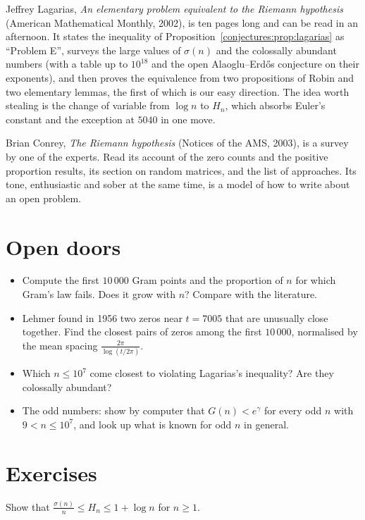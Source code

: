 Jeffrey Lagarias, \emph{An elementary problem equivalent to the Riemann hypothesis} (American Mathematical Monthly, 2002), is ten pages long and can be
read in an afternoon. It states the inequality of Proposition~\ref{conjectures:prop:lagarias} as ``Problem E'', surveys the large values of $\sigma(n)$ and the colossally
abundant numbers (with a table up to $10^{18}$ and the open Alaoglu--Erd\H{o}s conjecture on their exponents), and then proves the equivalence from two
propositions of Robin and two elementary lemmas, the first of which is our easy direction. The idea worth stealing is the change of variable from
$\log n$ to $H_n$, which absorbs Euler's constant and the exception at $5040$ in one move.

Brian Conrey, \emph{The Riemann hypothesis} (Notices of the AMS, 2003), is a survey by one of the experts. Read its account of the zero counts and the
positive proportion results, its section on random matrices, and the list of approaches. Its tone, enthusiastic and sober at the same time, is a model
of how to write about an open problem.

\section{Open doors}

\begin{itemize}
\item Compute the first $10\,000$ Gram points and the proportion of $n$ for which Gram's law fails. Does it grow with $n$? Compare with the literature.
\item Lehmer found in 1956 two zeros near $t=7005$ that are unusually close together. Find the closest pairs of zeros among the first $10\,000$, normalised
by the mean spacing $\frac{2\pi}{\log(t/2\pi)}$.
\item Which $n\le10^7$ come closest to violating Lagarias's inequality? Are they colossally abundant?
\item The odd numbers: show by computer that $G(n)<e^\gamma$ for every odd $n$ with $9<n\le10^7$, and look up what is known for odd $n$ in general.
\end{itemize}

\section{Exercises}

\begin{exercise}[$\star$]\label{conjectures:ex:sigmaH}
Show that $\frac{\sigma(n)}n\le H_n\le1+\log n$ for $n\ge1$.
\end{exercise}

